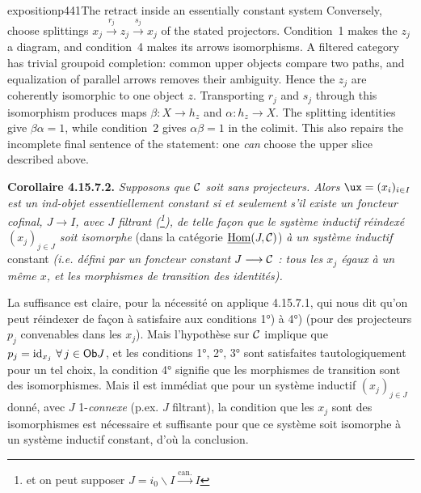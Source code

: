 \begin{dcomment}{exposition}{p441}{The retract inside an essentially constant system}
Conversely, choose splittings $x_j\xrightarrow{r_j}z_j\xrightarrow{s_j}x_j$ of the stated projectors. Condition~1 makes the $z_j$ a diagram, and condition~4 makes its arrows isomorphisms. A filtered category has trivial groupoid completion: common upper objects compare two paths, and equalization of parallel arrows removes their ambiguity. Hence the $z_j$ are coherently isomorphic to one object $z$. Transporting $r_j$ and $s_j$ through this isomorphism produces maps $\beta:X\to h_z$ and $\alpha:h_z\to X$. The splitting identities give $\beta\alpha=1$, while condition~2 gives $\alpha\beta=1$ in the colimit. This also repairs the incomplete final sentence of the statement: one \emph{can} choose the upper slice described above.
\end{dcomment}


\textbf{Corollaire 4.15.7.2.} \textit{Supposons que $\mathcal{C}$ soit sans projecteurs. Alors $\ux = (x_i)_{i\in I}$ est un ind-objet essentiellement constant si et seulement s'il existe un foncteur cofinal, $J \longrightarrow I$, avec $J$ filtrant (\footnote{et on peut supposer $J = i_0\backslash I \xrightarrow{\text{can.}} I$}), de telle façon que le système inductif réindexé $(x_j)_{j\in J}$ soit isomorphe} (dans la catégorie $\underline{\mathrm{Hom}}(J,\mathcal{C})$) \textit{à un système inductif} constant \textit{(i.e. défini par un foncteur constant $J \longrightarrow \mathcal{C}$ : tous les $x_j$ égaux à un même $x$, et les morphismes de transition des identités).}

La suffisance est claire, pour la nécessité on applique 4.15.7.1, qui nous dit qu'on peut réindexer de façon à satisfaire aux conditions 1°) à 4°) (pour des projecteurs $p_j$ convenables dans les $x_j$). Mais l'hypothèse sur $\mathcal{C}$ implique que $p_j = \mathrm{id}_{x_j}\ \forall\, j \in \mathsf{Ob} J$, et les conditions 1°, 2°, 3° sont satisfaites tautologiquement pour un tel choix, la condition 4° signifie que les morphismes de transition sont des isomorphismes. Mais il est immédiat que pour un système inductif $(x_j)_{j\in J}$ donné, avec $J$ 1-\textit{connexe} (p.ex. $J$ filtrant), la condition que les $x_j$ sont des isomorphismes %
est nécessaire et suffisante pour que ce système soit isomorphe à un système inductif constant, d'où la conclusion.

